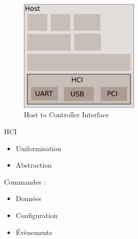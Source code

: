 \begin{frame}
\begin{minipage}[t]{0.60\linewidth}
	\begin{figure}
		\includegraphics[height=5.5cm]{arch_log_hci.png}
		\caption{Host to Controller Interface}
	\end{figure}
\end{minipage}
\begin{minipage}[t]{0.30\linewidth}
	\begin{block}{HCI}
		\begin{itemize}
			\item Uniformisation
			\item Abstraction
		\end{itemize}
		Commandes : 
		\begin{itemize}
			\item Données
			\item Configuration
			\item Évènements
		\end{itemize}
	\end{block}
\end{minipage}
\end{frame}

